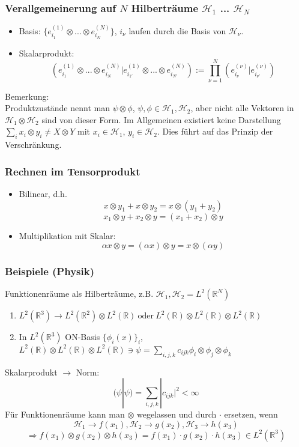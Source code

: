 \documentclass[twoside,a4paper]{scrartcl}
\renewcommand{\1}{\mathds{1}}
\newcommand{\ra}{\rightarrow}
\begin{document}
\subsubsection*{Verallgemeinerung auf $N$ Hilberträume $\mathcal H_1$ ... $\mathcal H_N$}
\begin{itemize}
 \item Basis: $\{e_{i_1}^{(1)}\otimes ... \otimes e_{i_N}^{(N)} \}$, $i_\nu$ laufen durch die Basis von $\mathcal H_\nu$.
 \item Skalarprodukt:  $$(e_{i_1}^{(1)}\otimes ... \otimes e_{i_N}^{(N)}|e_{i_{1'}}^{(1)}\otimes ... \otimes e_{i_{N'}}^{(N)}):=\prod_{\nu=1}^N (e_{i_\nu}^{(\nu)} |e_{i_{\nu'}}^{(\nu)})$$
\end{itemize}
Bemerkung:\\
Produktzustände nennt man $\psi \otimes \phi$, $\psi,\phi \in \mathcal H_1,\mathcal H_2$, aber nicht alle Vektoren in $\mathcal H_1 \otimes \mathcal H_2$ sind von dieser Form. Im Allgemeinen existiert keine Darstellung $\sum_i x_i \otimes y_i \neq X \otimes Y$ mit $x_i \in \mathcal H_1$, $y_i \in \mathcal H_2$. Dies führt auf das Prinzip der Verschränkung.
\subsubsection*{Rechnen im Tensorprodukt}
\begin{itemize}
 \item Bilinear, d.h. $$x \otimes y_1+x\otimes y_2=x\otimes(y_1+y_2) $$
$$x_1 \otimes y+x_2\otimes y=(x_1+x_2)\otimes y $$
\item Multiplikation mit Skalar:
$$\alpha x \otimes y = (\alpha x)\otimes y=x \otimes (\alpha y)$$
\end{itemize}
\subsubsection*{Beispiele (Physik)}
Funktionenräume als Hilberträume, z.B. $\mathcal H_1, \mathcal H_2=L^2(\mathbb R^N)$
\begin{enumerate}
 \item $L^2(\mathbb R^3) \ra L^2(\mathbb R^2) \otimes L^2(\mathbb R) \ \mathrm{oder} \  L^2(\mathbb R) \otimes L^2(\mathbb R) \otimes L^2(\mathbb R) $ 
 \item In $L^2(\mathbb R^3)$ ON-Basis $\{ \phi_i(x)\}_i$, $L^2(\mathbb R) \otimes L^2(\mathbb R) \otimes L^2(\mathbb R) \ni \psi=\sum_{i,j,k} c_{ijk} \phi_i\otimes  \phi_j \otimes \phi_k$
\end{enumerate}
Skalarprodukt $\ra$ Norm:
$$(\psi|\psi)=\sum_{i,j,k} |c_{ijk}|^2 < \infty$$
Für Funktionenräume kann man $\otimes$ wegelassen  und durch $\cdot$ ersetzen, wenn  
$$\mathcal H_1 \ra f(x_1),\mathcal H_2 \ra g(x_2),\mathcal H_3 \ra h(x_3) $$
$$ \Rightarrow f(x_1) \otimes g(x_2) \otimes h(x_3)=f(x_1) \cdot g(x_2) \cdot h(x_3) \in L^2(\mathbb R^3)$$
\end{document}

